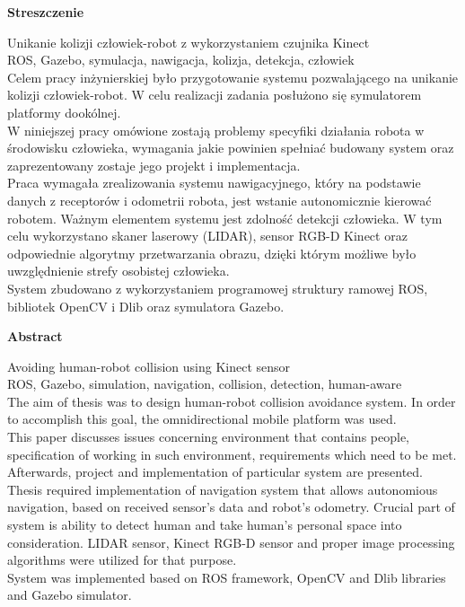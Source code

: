 
\begin{center}
\begin{large}
\textbf{Streszczenie}
\end{large}
\end{center}

 Unikanie kolizji człowiek-robot z wykorzystaniem czujnika Kinect \\
 ROS, Gazebo, symulacja, nawigacja, kolizja, detekcja, człowiek \\

Celem pracy inżynierskiej było przygotowanie systemu pozwalającego na unikanie kolizji człowiek-robot. W celu realizacji zadania posłużono się symulatorem platformy dookólnej.\\
\indent W niniejszej pracy omówione zostają problemy specyfiki działania robota w środowisku człowieka, wymagania jakie powinien spełniać budowany system oraz zaprezentowany zostaje jego projekt i implementacja.\\ 
\indent Praca wymagała zrealizowania systemu nawigacyjnego, który na podstawie danych z receptorów i odometrii robota, jest wstanie autonomicznie kierować robotem. Ważnym elementem systemu jest zdolność detekcji człowieka. W tym celu wykorzystano skaner laserowy (LIDAR), sensor RGB-D Kinect oraz odpowiednie algorytmy przetwarzania obrazu, dzięki którym możliwe było uwzględnienie strefy osobistej człowieka. \\
\indent System zbudowano z wykorzystaniem programowej struktury ramowej ROS, bibliotek OpenCV i Dlib oraz symulatora Gazebo.

\newpage

\begin{center}
\begin{large}
\textbf{Abstract}
\end{large}
\end{center}

 Avoiding human-robot collision using Kinect sensor\\
 ROS, Gazebo, simulation, navigation, collision, detection, human-aware \\

The aim of thesis was to design human-robot collision avoidance system. In order to accomplish this goal, the omnidirectional mobile platform was used.\\
\indent This paper discusses issues concerning environment that contains people, specification of working in such environment, requirements which need to be met. Afterwards, project and implementation of particular system are presented.\\
\indent Thesis required implementation of navigation system that allows  autonomious navigation, based on received sensor's data and robot's odometry. Crucial part of system is ability to detect human and take human's personal space into consideration. LIDAR sensor, Kinect RGB-D sensor and proper image processing algorithms were utilized for that purpose. \\
\indent System was implemented based on ROS framework, OpenCV and Dlib libraries and Gazebo simulator. 



\newpage